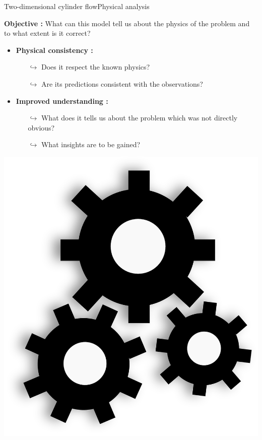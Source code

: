 \documentclass[usenames,dvipsnames,svgnames,10pt,aspectratio=169]{beamer}
\begin{document}
\begin{frame}[t, c]{Two-dimensional cylinder flow}{Physical analysis}
  \begin{minipage}{.68\textwidth}
    \begin{tcolorbox}[colback=white, colframe=beamer@kthblue]
      \textbf{Objective :} What can this model tell us about the physics of the problem and to what extent is it correct?
    \end{tcolorbox}

    \bigskip

    \begin{itemize}
    \item \textbf{Physical consistency :}
      \begin{itemize}
      \item[$\hookrightarrow$] Does it respect the known physics?
      \item[$\hookrightarrow$] Are its predictions consistent with the observations?
      \end{itemize}

      \medskip

    \item \textbf{Improved understanding :}
      \begin{itemize}
      \item[$\hookrightarrow$] What does it tells us about the problem which was not directly obvious?

      \item[$\hookrightarrow$] What insights are to be gained?
      \end{itemize}
    \end{itemize}
  \end{minipage}%
  \hfill
  \begin{minipage}{.28\textwidth}
    \centering
    \includegraphics[width=\textwidth]{Gears}
  \end{minipage}
\end{frame}
\end{document}
